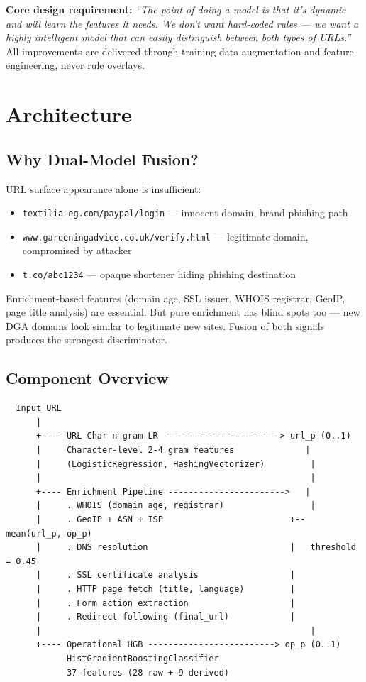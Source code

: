 \documentclass[11pt,a4paper]{article}
\newcommand{\code}[1]{\texttt{#1}}
\begin{document}
\medskip
\textbf{Core design requirement:} \textit{``The point of doing a model
is that it's dynamic and will learn the features it needs. We don't
want hard-coded rules --- we want a highly intelligent model that can
easily distinguish between both types of URLs.''} All improvements are
delivered through training data augmentation and feature engineering,
never rule overlays.

\section{Architecture}

\subsection{Why Dual-Model Fusion?}

URL surface appearance alone is insufficient:

\begin{itemize}[noitemsep]
  \item \code{textilia-eg.com/paypal/login} --- innocent domain,
        brand phishing path
  \item \code{www.gardeningadvice.co.uk/verify.html} --- legitimate
        domain, compromised by attacker
  \item \code{t.co/abc1234} --- opaque shortener hiding phishing
        destination
\end{itemize}

Enrichment-based features (domain age, SSL issuer, WHOIS registrar,
GeoIP, page title analysis) are essential. But pure enrichment has
blind spots too --- new DGA domains look similar to legitimate new
sites. Fusion of both signals produces the strongest discriminator.

\subsection{Component Overview}

\begin{lstlisting}
  Input URL
      |
      +---- URL Char n-gram LR -----------------------> url_p (0..1)
      |     Character-level 2-4 gram features              |
      |     (LogisticRegression, HashingVectorizer)         |
      |                                                     |
      +---- Enrichment Pipeline ----------------------->   |
      |     . WHOIS (domain age, registrar)                 |
      |     . GeoIP + ASN + ISP                         +-- mean(url_p, op_p)
      |     . DNS resolution                            |   threshold = 0.45
      |     . SSL certificate analysis                  |
      |     . HTTP page fetch (title, language)         |
      |     . Form action extraction                    |
      |     . Redirect following (final_url)            |
      |                                                     |
      +---- Operational HGB -------------------------> op_p (0..1)
            HistGradientBoostingClassifier
            37 features (28 raw + 9 derived)
\end{lstlisting}
\end{document}
